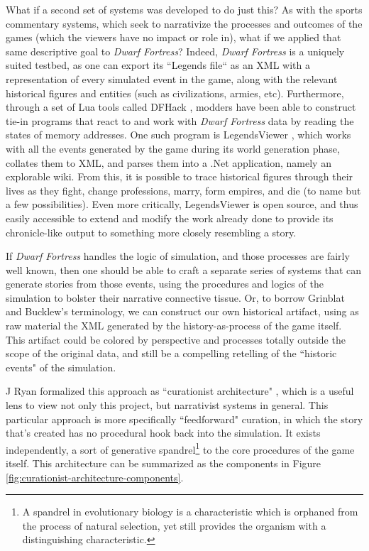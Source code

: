 What if a second set of systems was developed to do just this? As with the sports commentary systems, which seek to narrativize the processes and outcomes of the games (which the viewers have no impact or role in), what if we applied that same descriptive goal to \textit{Dwarf Fortress}? Indeed, \textit{Dwarf Fortress} is a uniquely suited testbed, as one can export its ``Legends file`` as an XML with a representation of every simulated event in the game, along with the relevant historical figures and entities (such as civilizations, armies, etc). Furthermore, through a set of Lua tools called DFHack \cite{dfHack}, modders have been able to construct tie-in programs that react to and work with \textit{Dwarf Fortress} data by reading the states of memory addresses. One such program is LegendsViewer \cite{legendsviewer}, which works with all the events generated by the game during its world generation phase, collates them to XML, and parses them into a .Net application, namely an explorable wiki. From this, it is possible to trace historical figures through their lives as they fight, change professions, marry, form empires, and die (to name but a few possibilities). Even more critically, LegendsViewer is open source, and thus easily accessible to extend and modify the work already done to provide its chronicle-like output to something more closely resembling a story.

If \textit{Dwarf Fortress} handles the logic of simulation, and those processes are fairly well known, then one should be able to craft a separate series of systems that can generate stories from those events, using the procedures and logics of the simulation to bolster their narrative connective tissue. Or, to borrow Grinblat and Bucklew's terminology, we can construct our own historical artifact, using as raw material the XML generated by the history-as-process of the game itself. This artifact could be colored by perspective and processes totally outside the scope of the original data, and still be a compelling retelling of the ``historic events" of the simulation.

J Ryan formalized this approach as ``curationist architecture" \cite[p.~232]{ryan2018curating}, which is a useful lens to view not only this project, but narrativist systems in general. This particular approach is more specifically ``feedforward" curation, in which the story that's created has no procedural hook back into the simulation. It exists independently, a sort of generative spandrel\footnote{A spandrel in evolutionary biology is a characteristic which is orphaned from the process of natural selection, yet still provides the organism with a distinguishing characteristic.} to the core procedures of the game itself. This architecture can be summarized as the components in Figure  \ref{fig:curationist-architecture-components}.

